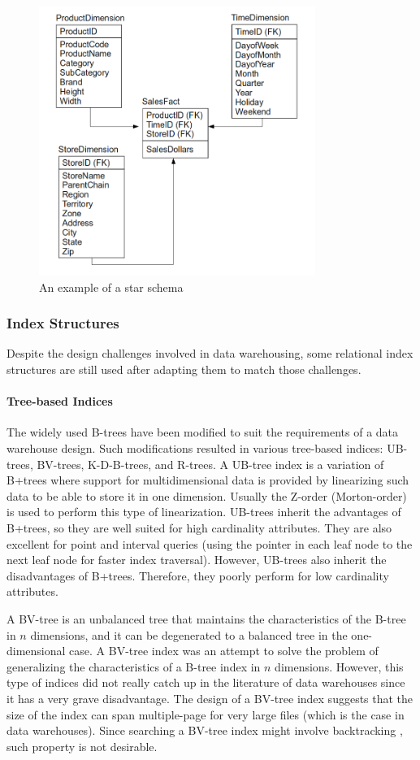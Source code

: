 \documentclass[12pt,a4paper]{article}
\begin{document}
\begin{figure}[!t]
\centering
\includegraphics[width=9cm]{figs/starschema.png}
\caption{An example of a star schema}
\label{fig:starschema}
\end{figure}

\subsubsection{Index Structures}
Despite the design challenges involved in data warehousing, some relational index structures are still used after adapting them to match those challenges. 

\paragraph{Tree-based Indices}
The widely used B-trees have been modified to suit the requirements of a data warehouse design. Such modifications resulted in various tree-based indices:
UB-trees, BV-trees, K-D-B-trees, and R-trees. A UB-tree index \cite{bayer1997universal} is a variation of B+trees where support for multidimensional data is
provided by linearizing such data to be able to store it in one dimension. Usually the Z-order (Morton-order) \cite{morton1966computer} is used to perform this
type of linearization. UB-trees inherit the advantages of B+trees, so they are well suited for high cardinality attributes. They are also excellent for point
and interval queries (using the pointer in each leaf node to the next leaf node for faster index traversal). However, UB-trees also inherit the disadvantages of
B+trees. Therefore, they poorly perform for low cardinality attributes.

A BV-tree \cite{freeston1995general} is an unbalanced tree that maintains the characteristics of the B-tree in $n$ dimensions, and it can be degenerated to a
balanced tree in the one-dimensional case. A BV-tree index was an attempt to solve the problem of generalizing the characteristics of a B-tree index in $n$
dimensions. However, this type of indices did not really catch up in the literature of data warehouses since it has a very grave disadvantage. The
design of a BV-tree index suggests that the size of the index can span multiple-page for very large files (which is the case in data warehouses). Since
searching a BV-tree index might involve backtracking \cite{freeston1995general}, such property is not desirable.
\end{document}
